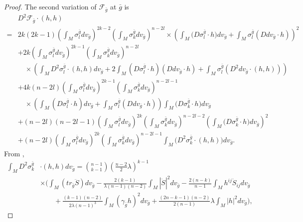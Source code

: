 \documentclass[12pt]{amsart}
\newcommand{\bg}{\bar{g}}
\numberwithin{equation}{section}
\begin{document}
\begin{proof}
   The second variation of $\mathcal{F}_{\bg}$ at $\bg$ is
   \begin{align*}
       &D^2\mathcal{F}_{\bg}\cdot(h,h)\\
       =&2k(2k-1) \left(\int_M\sigma_l^{\bg}dv_{\bg}\right)^{2k-2} \left(\int_M\sigma_k^{\bg}dv_{\bg}\right)^{n-2l} \times\left(\int_M\big(D\sigma_l^{\bg}\cdot h)dv_{\bg}+\int_M\sigma_l^{\bg}(Ddv_{\bg}\cdot h)\right)^2\\
       &+2k\left(\int_M\sigma_l^{\bg}dv_{\bg}\right)^{2k-1}\left(\int_M\sigma_k^{\bg}dv_{\bg}\right)^{n-2l}\\
       &\quad\times\left(\int_MD^2\sigma_l^{\bg}\cdot(h,h)dv_{\bg}+2\int_M(D\sigma_l^{\bg}\cdot h)(Ddv_{\bg}\cdot h)+\int_M\sigma_l^{\bg}(D^2dv_{\bg}\cdot(h,h))\right)\\
       &+4k(n-2l)\left(\int_M\sigma_l^{\bg}dv_{\bg}\right)^{2k-1}\left(\int_M\sigma_k^{\bg}dv_{\bg}\right)^{n-2l-1}\\
       &\quad\times\left(\int_M(D\sigma_l^{\bg}\cdot h)dv_{\bg}+\int_M\sigma_l^{\bg}(Ddv_{\bg}\cdot h)\right)\int_M\big(D\sigma_k^{\bg}\cdot h\big)dv_{\bg}\\
       &+(n-2l)(n-2l-1)\left(\int_M\sigma_l^{\bg}dv_{\bg}\right)^{2k}\left(\int_M\sigma_k^{\bg}dv_{\bg}\right)^{n-2l-2}\left(\int_M\big(D\sigma_k^{\bg}\cdot h\big)dv_{\bg}\right)^2\\
       &+(n-2l)\left(\int_M\sigma_l^{\bg}dv_{\bg}\right)^{2k}\left(\int_M\sigma_k^{\bg}dv_{\bg}\right)^{n-2l-1}\int_M\big(D^2\sigma_k^{\bg}\cdot (h,h)\big)dv_{\bg}.
   \end{align*}
   From ,
   \begin{equation*}
    \begin{split}
        \int_MD^2\sigma_k^{\bg}&\cdot(h,h)dv_{\bg}=\binom{n-1}{k-1}\left(\frac{n-2}{2}\lambda\right)^{k-1}\\
        &\times\bigg(\int_M(tr_{\bg}\ddot{S})dv_{\bg}-\frac{2(k-1)}{\lambda(n-1)(n-2)}\int_M|\dot{S}|^2dv_{\bg}-\frac{2(n-k)}{n-1}\int_Mh^{ij}\dot{S}_{ij}dv_{\bg}\\
        &\qquad+\frac{(k-1)(n-2)}{2\lambda(n-1)^3}\int_M(\gamma_{\bg}h)^2dv_{\bg}+\frac{(2n-k-1)(n-2)}{2(n-1)}\lambda\int_M|h|^2dv_{\bg}\bigg),
    \end{split}
   \end{equation*}


\end{proof}
\end{document}

